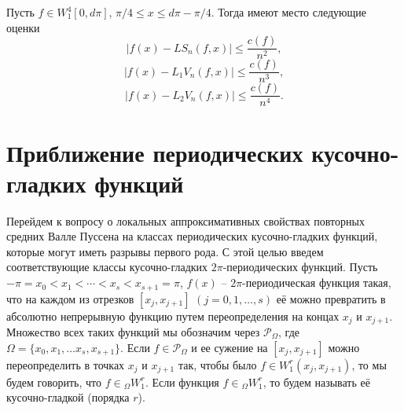 \begin{corollary}\label{cor}
  Пусть $f\in W_1^{4}[0,d\pi]$, $\pi/4\le x\le d\pi-\pi/4$. Тогда имеют место следующие оценки
  $$
  |f(x)-LS_n(f,x)|\le \frac{c(f)}{n^2},
  $$
$$
  |f(x)-L_1V_n(f,x)|\le \frac{c(f)}{n^3},
  $$
$$
  |f(x)-L_2V_n(f,x)|\le \frac{c(f)}{n^4}.
  $$
\end{corollary}











\section{Приближение периодических кусочно-гладких  функций}


Перейдем к вопросу о локальных  аппроксимативных свойствах повторных средних Валле Пуссена на классах периодических кусочно-гладких функций, которые могут иметь разрывы первого рода.
С этой целью введем соответствующие классы кусочно-гладких $2\pi$-периодических функций.
Пусть $-\pi=x_0<x_1<\cdots<x_s<x_{s+1}=\pi$,
$f(x)$ -- $2\pi$-периодическая функция такая, что на каждом из отрезков $[x_j,x_{j+1}]$ $(j=0,1,\ldots,s)$ её можно превратить в абсолютно непрерывную функцию путем переопределения на концах $x_j$ и $x_{j+1}$. Множество всех таких функций мы обозначим  через $\mathcal{ P}_\Omega$, где $\Omega=\{x_0,x_1,\ldots x_s,x_{s+1}\}$.
Если $f\in \mathcal{  P}_\Omega$ и ее сужение на $[x_j,x_{j+1}]$ можно переопределить в точках
$x_j$ и $x_{j+1}$ так, чтобы было $f\in W_1^r(x_j,x_{j+1})$, то мы будем говорить, что $f\in {}_\Omega W_1^r$. Если функция $f\in{}_\Omega W_1^r$, то будем называть её кусочно-гладкой (порядка $r$).



